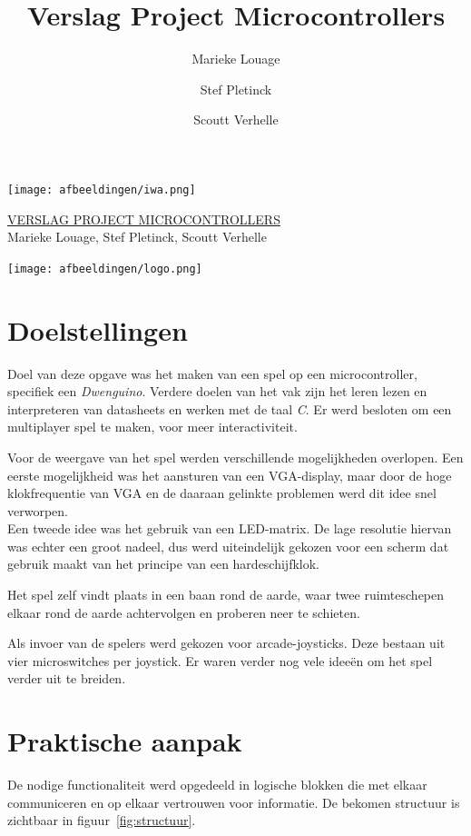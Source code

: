 \documentclass[a4paper, 12pt]{article}
\title{Verslag Project Microcontrollers}
\author{Marieke Louage \and Stef Pletinck \and Scoutt Verhelle}
\begin{document}
\begin{titlepage}
  \texttt{[image: afbeeldingen/iwa.png]}
  \vspace{2cm}
  \vfill

  {\ptitle \underline{\uppercase{Verslag project microcontrollers}}}\\[1em]
  \Large{\panno Marieke Louage, Stef Pletinck, Scoutt Verhelle}
  \vfill

  \texttt{[image: afbeeldingen/logo.png]}

\end{titlepage}

\tableofcontents
\newpage

\section{Doelstellingen}
Doel van deze opgave was het maken van een spel op een microcontroller,
specifiek een \emph{Dwenguino}.
Verdere doelen van het vak zijn het leren lezen en interpreteren van datasheets
en werken met de taal \emph{C}.
Er werd besloten om een multiplayer spel te maken,
voor meer interactiviteit.

Voor de weergave van het spel werden verschillende mogelijkheden overlopen.
Een eerste mogelijkheid was het aansturen van een VGA-display,
maar door de hoge klokfrequentie van VGA en de daaraan gelinkte problemen
werd dit idee snel verworpen.\\
Een tweede idee was het gebruik van een LED-matrix.
De lage resolutie hiervan was echter een groot nadeel,
dus werd uiteindelijk gekozen voor een scherm dat gebruik maakt
van het principe van een hardeschijfklok.

Het spel zelf vindt plaats in een baan rond de aarde, waar twee ruimteschepen
elkaar rond de aarde achtervolgen en proberen neer te schieten.

Als invoer van de spelers werd gekozen voor arcade-joysticks.
Deze bestaan uit vier microswitches per joystick.
Er waren verder nog vele ideeën om het spel verder uit te breiden.

\section{Praktische aanpak}
De nodige functionaliteit werd opgedeeld in logische blokken die met elkaar
communiceren en op elkaar vertrouwen voor informatie. De bekomen structuur is
zichtbaar in figuur~\ref{fig:structuur}.
\end{document}
